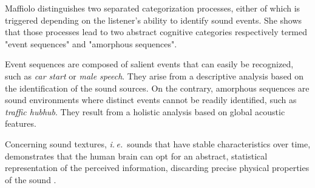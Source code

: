 \documentclass[12pt]{elsarticle}
\newcommand{\ie}{\emph{i.\,e.}}
\begin{document}
Maffiolo \cite{maffiolo_caracterisation_1999} distinguishes two separated categorization processes, either of which is triggered depending on the listener's ability to identify sound events. She shows that those processes lead to two abstract cognitive categories respectively termed "event sequences" and "amorphous sequences".


Event sequences are composed of salient events that can easily be recognized, such as \emph{car start} or \emph{male speech}. They arise from a descriptive analysis based on the identification of the sound sources. On the contrary, amorphous sequences are sound environments where distinct events cannot be readily identified, such as \emph{traffic hubhub}. They result from a holistic analysis based on global acoustic features.


Concerning sound textures, \ie~sounds that have stable characteristics over time, \cite{mcdermott2011sound,mcdermott2013summary} demonstrates that the human brain can opt for an abstract, statistical representation of the perceived information, discarding precise physical properties of the sound \cite{nelken2013ear}.

\end{document}
